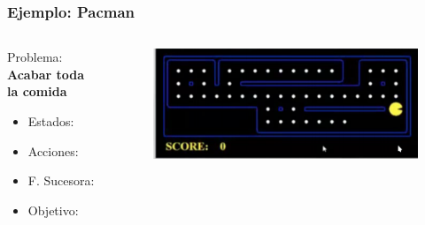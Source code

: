 \documentclass[10pt]{beamer}
\begin{document}
\begin{frame}
  \frametitle{Ejemplo: Pacman}

  \begin{columns}
    \begin{column}{0.5\textwidth}
      Problema: \textbf{Acabar toda la comida}
      \begin{itemize}
        \item Estados:
        \item Acciones:
        \item F. Sucesora:
        \item Objetivo:
      \end{itemize}
    \end{column}
    
    \begin{column}{0.5\textwidth}
      \begin{figure}[!h] 
        \centering
        \includegraphics[width=\textwidth]{img/pacman2}
      \end{figure} 
    \end{column}
  \end{columns}

\end{frame}
\end{document}
